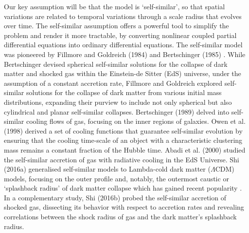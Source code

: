 Our key assumption will be that the model is `self-similar', so that spatial variations are related to temporal variations through a scale radius that evolves over time. The self-similar assumption offers a powerful tool to simplify the problem and render it more tractable, by converting nonlinear coupled partial differential equations into ordinary differential equations. The self-similar model was pioneered by Fillmore and Goldreich (1984) \cite{1984FillmoreGoldreich} and Bertschinger (1985) \cite{1985Bertschinger}. While Bertschinger devised spherical self-similar solutions for the collapse of dark matter and shocked gas within the Einstein-de Sitter (EdS) universe, under the assumption of a constant accretion rate, Fillmore and Goldreich explored self-similar solutions for the collapse of dark matter from various initial mass distributions, expanding their purview to include not only spherical but also cylindrical and planar self-similar collapses. Bertschinger (1989) \cite{1989Bertschinger} delved into self-similar cooling flows of gas, focusing on the inner regions of galaxies. Owen et al. (1998) \cite{1998OwenWeinberg_etal} derived a set of cooling functions that guarantee self-similar evolution by ensuring that the cooling time-scale of an object with a characteristic clustering mass remains a constant fraction of the Hubble time. Abadi et al. (2000) \cite{2000Abadi_etal_SelfSimCool} studied the self-similar accretion of gas with radiative cooling in the EdS Universe. Shi (2016a) \cite{2016ShiDMLamCDM} generalised self-similar models to Lambda-cold dark matter ($\Lambda$CDM) models, focusing on the outer profile and, notably, the outermost caustic or `splashback radius' of dark matter collapse which has gained recent popularity \cite{2014DiemerKrastov,2014AdhikariDalalChamberlain,2018Changetal_DES_splashback}.
In a complementary study, Shi (2016b) \cite{2016ShiICM} probed the self-similar accretion of shocked gas, dissecting its behavior with respect to accretion rates and revealing correlations between the shock radius of gas and the dark matter's splashback radius.



